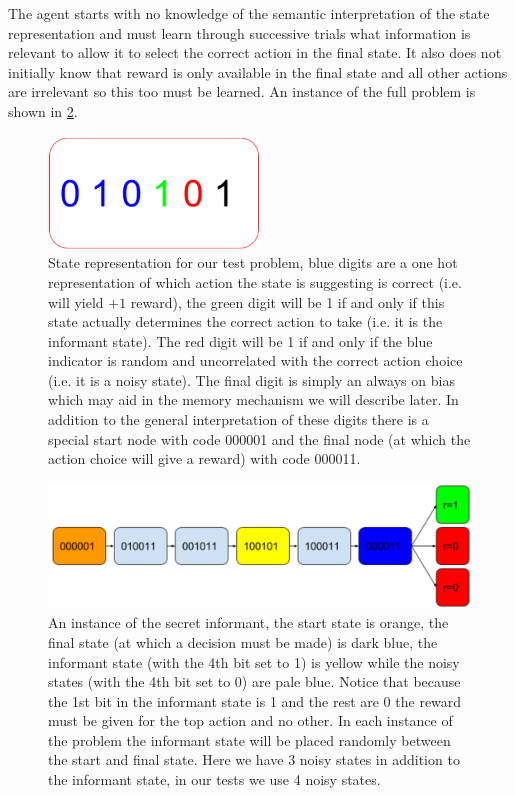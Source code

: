 \documentclass{article}
\begin{document}
The agent starts with no knowledge of the semantic interpretation of the state representation and must learn through successive trials what information is relevant to allow it to select the correct action in the final state. It also does not initially know that reward is only available in the final state and all other actions are irrelevant so this too must be learned. An instance of the full problem is shown in \ref{fig:problem}.
\begin{figure}[!ht]
\center
\includegraphics[width=0.5\textwidth]{images/state.png}
\caption{State representation for our test problem, blue digits are a one hot representation of which action the state is suggesting is correct (i.e. will yield $+1$ reward), the green digit will be 1 if and only if this state actually determines the correct action to take (i.e. it is the informant state). The red digit will be 1 if and only if the blue indicator is random and uncorrelated with the correct action choice (i.e. it is a noisy state). The final digit is simply an always on bias which may aid in the memory mechanism we will describe later. In addition to the general interpretation of these digits there is a special start node with code 000001 and the final node (at which the action choice will give a reward) with code 000011.}
\label{fig:state}
\end{figure}

\begin{figure}[!ht]
\includegraphics[width=1\textwidth]{images/problem.png}
\caption{An instance of the secret informant, the start state is orange, the final state (at which a decision must be made) is dark blue, the informant state (with the 4th bit set to 1) is yellow while the noisy states (with the 4th bit set to 0) are pale blue. Notice that because the 1st bit in the informant state is 1 and the rest are 0 the reward must be given for the top action and no other. In each instance of the problem the informant state will be placed randomly between the start and final state. Here we have 3 noisy states in addition to the informant state, in our tests we use 4 noisy states.}
\label{fig:problem}
\end{figure}
\end{document}
